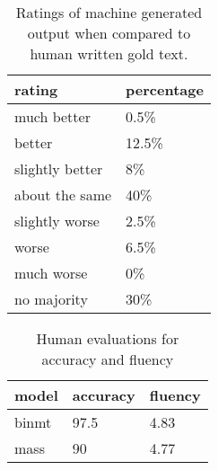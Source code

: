 \documentclass[11pt,a4paper]{article}
\begin{document}
\begin{table}[]
\centering
\begin{tabular}{l|l}
\hline
  rating             &   percentage     \\ \hline
 much better     & 0.5\%  \\
 better          & 12.5\% \\
 slightly better & 8\%    \\
 about the same  & 40\%  \\ 
 slightly worse  & 2.5\%  \\ 
 worse           & 6.5\%  \\ 
 much worse      & 0\%    \\
 no majority     & 30\%  \\ \hline
\end{tabular}
\caption{Ratings of machine generated output when compared to human written gold text.}
\end{table}



\begin{table}[]
\centering
\begin{tabular}{l|l|l}
\hline
model & accuracy  & fluency  \\ \hline
binmt & 97.5     & 4.83    \\ 
mass  & 90       & 4.77    \\ \hline
\end{tabular}
\caption{Human evaluations for accuracy and fluency}
\label{results-human}
\end{table}
\end{document}
